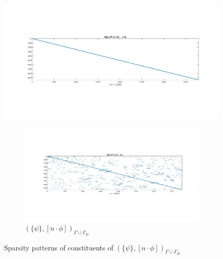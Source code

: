 \documentclass[a4paper]{book}
\begin{document}
\begin{figure}[H]
\begin{minipage}[c]{0.5\textwidth}
  \caption{$( \psi^- ,(n \cdot \phi)^+)_{\Gamma \cup \Gamma_D}$}
  \label{fig:figure43}
  \end{minipage}\hfill
    \begin{minipage}[c]{0.5\textwidth}
    \includegraphics[width=\textwidth]{figure44.jpg}
  \caption{$( \psi^- ,(n \cdot \phi)^-)_{\Gamma \cup \Gamma_D}$}
  \label{fig:figure44}
  \end{minipage}\hfill
  \begin{subfigure}{\textwidth}	
\centering
  \includegraphics[width=\textwidth]{figure4.jpg}
  \caption{$(\lbrace \psi \rbrace ,[n \cdot \phi])_{\Gamma \cup \Gamma_D}$}
  \label{fig:figure4}
\end{subfigure}
\caption{Sparsity patterns of constituents of $(\lbrace \psi  \rbrace,[n \cdot \phi])_{\Gamma \cup \Gamma_D}$}
\label{figure_4_all}
\end{figure}
\end{document}
